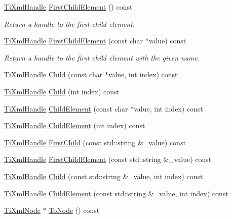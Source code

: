 \begin{DoxyCompactItemize}
\hyperlink{class_ti_xml_handle}{Ti\+Xml\+Handle} \hyperlink{class_ti_xml_handle_af0643f8683f3f2b779b8c9d78c67b2c0}{First\+Child\+Element} () const
\begin{DoxyCompactList}\small\item\em Return a handle to the first child element. \end{DoxyCompactList}\item 
\hyperlink{class_ti_xml_handle}{Ti\+Xml\+Handle} \hyperlink{class_ti_xml_handle_a3eaf2d2d4c087cd8a48da261042e75bc}{First\+Child\+Element} (const char $\ast$value) const
\begin{DoxyCompactList}\small\item\em Return a handle to the first child element with the given name. \end{DoxyCompactList}\item 
\hyperlink{class_ti_xml_handle}{Ti\+Xml\+Handle} \hyperlink{class_ti_xml_handle_a9903b035444ee36450fe00ede403f920}{Child} (const char $\ast$value, int index) const
\item 
\hyperlink{class_ti_xml_handle}{Ti\+Xml\+Handle} \hyperlink{class_ti_xml_handle_a32585942abb28e03eea9c5223f38a659}{Child} (int index) const
\item 
\hyperlink{class_ti_xml_handle}{Ti\+Xml\+Handle} \hyperlink{class_ti_xml_handle_afccc59d8a0daa8c5d78474fbed430ddb}{Child\+Element} (const char $\ast$value, int index) const
\item 
\hyperlink{class_ti_xml_handle}{Ti\+Xml\+Handle} \hyperlink{class_ti_xml_handle_a57a639ab0ac99ff9358f675a1b73049a}{Child\+Element} (int index) const
\item 
\hyperlink{class_ti_xml_handle}{Ti\+Xml\+Handle} \hyperlink{class_ti_xml_handle_afd813aae06c0449b04ccf0237076495e}{First\+Child} (const std\+::string \&\+\_\+value) const
\item 
\hyperlink{class_ti_xml_handle}{Ti\+Xml\+Handle} \hyperlink{class_ti_xml_handle_ad048deff008dbb4b6887e9ac0d91f7df}{First\+Child\+Element} (const std\+::string \&\+\_\+value) const
\item 
\hyperlink{class_ti_xml_handle}{Ti\+Xml\+Handle} \hyperlink{class_ti_xml_handle_abc163863954f3e3cf38d08c0773ce066}{Child} (const std\+::string \&\+\_\+value, int index) const
\item 
\hyperlink{class_ti_xml_handle}{Ti\+Xml\+Handle} \hyperlink{class_ti_xml_handle_afac0eed86787294829cca36c44626be2}{Child\+Element} (const std\+::string \&\+\_\+value, int index) const
\item 
\hyperlink{class_ti_xml_node}{Ti\+Xml\+Node} $\ast$ \hyperlink{class_ti_xml_handle_a0e436dea2dd869a859e3a4486023f0fa}{To\+Node} () const

\end{DoxyCompactItemize}
